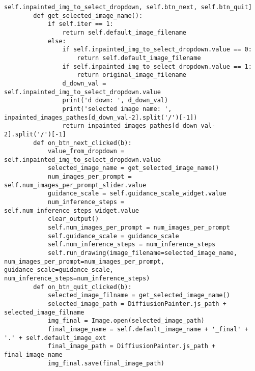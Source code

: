 \begin{lstlisting}[basicstyle=\ttfamily\small]
            self.inpainted_img_to_select_dropdown, self.btn_next, self.btn_quit]
        def get_selected_image_name():
            if self.iter == 1:
                return self.default_image_filename
            else:
                if self.inpainted_img_to_select_dropdown.value == 0:
                    return self.default_image_filename
                if self.inpainted_img_to_select_dropdown.value == 1:
                    return original_image_filename
                d_down_val = self.inpainted_img_to_select_dropdown.value
                print('d down: ', d_down_val)
                print('selected image name: ', inpainted_images_pathes[d_down_val-2].split('/')[-1])
                return inpainted_images_pathes[d_down_val-2].split('/')[-1]
        def on_btn_next_clicked(b):
            value_from_dropdown = self.inpainted_img_to_select_dropdown.value
            selected_image_name = get_selected_image_name()
            num_images_per_prompt = self.num_images_per_prompt_slider.value
            guidance_scale = self.guidance_scale_widget.value
            num_inference_steps = self.num_inference_steps_widget.value
            clear_output()
            self.num_images_per_prompt = num_images_per_prompt
            self.guidance_scale = guidance_scale
            self.num_inference_steps = num_inference_steps
            self.run_drawing(image_filename=selected_image_name, num_images_per_prompt=num_images_per_prompt, guidance_scale=guidance_scale, num_inference_steps=num_inference_steps)
        def on_btn_quit_clicked(b):
            selected_image_filname = get_selected_image_name()
            selected_image_path = DiffiusionPainter.js_path + selected_image_filname
            img_final = Image.open(selected_image_path)
            final_image_name = self.default_image_name + '_final' + '.' + self.default_image_ext
            final_image_path = DiffiusionPainter.js_path + final_image_name
            img_final.save(final_image_path)
                    \end{lstlisting}
